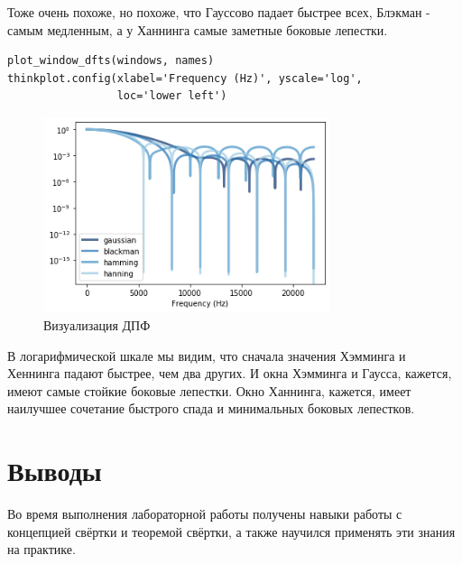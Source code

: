 \documentclass[a4paper,12pt]{report}
\begin{document}
Тоже очень похоже, но похоже, что Гауссово падает быстрее всех, Блэкман - самым медленным, а у Ханнинга самые заметные боковые лепестки.

\begin{lstlisting}[caption=Визуализация ДПФ]
plot_window_dfts(windows, names)
thinkplot.config(xlabel='Frequency (Hz)', yscale='log', 
                 loc='lower left')
\end{lstlisting}

\begin{figure}[H]
        \centering
        \includegraphics[width=0.75\textwidth]{lab8_fig3_3.png}
        \caption{Визуализация ДПФ}
        \label{fig:lab8_fig3_3}
\end{figure}

В логарифмической шкале мы видим, что сначала значения Хэмминга и Хеннинга падают быстрее, чем два других. И окна Хэмминга и Гаусса, кажется, имеют самые стойкие боковые лепестки. Окно Ханнинга, кажется, имеет наилучшее сочетание быстрого спада и минимальных боковых лепестков.

\chapter{Выводы}

Во время выполнения лабораторной работы получены навыки работы с концепцией свёртки и теоремой свёртки, а также научился применять эти знания на практике.
\end{document}
